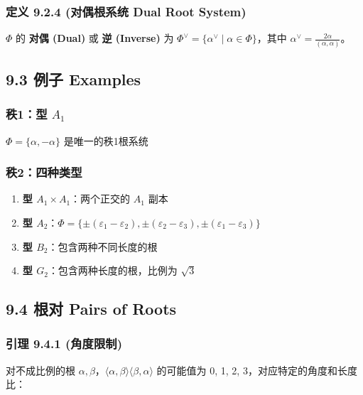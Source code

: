 \subsubsection{定义 9.2.4 (对偶根系统 Dual Root System)}

$\Phi$ 的 \textbf{对偶 (Dual)} 或 \textbf{逆 (Inverse)} 为 $\Phi^\vee = \{\alpha^\vee \mid \alpha \in \Phi\}$，其中 $\alpha^\vee = \frac{2\alpha}{(\alpha, \alpha)}$。

\subsection{9.3 例子 Examples}

\subsubsection{秩1：型 \texorpdfstring{$A_1$}{A_1}}

$\Phi = \{\alpha, -\alpha\}$ 是唯一的秩1根系统

\subsubsection{秩2：四种类型}

\begin{enumerate}
	\item \textbf{型 $A_1 \times A_1$}：两个正交的 $A_1$ 副本
	\item \textbf{型 $A_2$}：$\Phi = \{\pm(\varepsilon_1 - \varepsilon_2), \pm(\varepsilon_2 - \varepsilon_3), \pm(\varepsilon_1 - \varepsilon_3)\}$
	\item \textbf{型 $B_2$}：包含两种不同长度的根
	\item \textbf{型 $G_2$}：包含两种长度的根，比例为 $\sqrt{3}$
\end{enumerate}

\subsection{9.4 根对 Pairs of Roots}

\subsubsection{引理 9.4.1 (角度限制)}

对不成比例的根 $\alpha, \beta$，$\langle\alpha, \beta\rangle\langle\beta, \alpha\rangle$ 的可能值为 0, 1, 2, 3，对应特定的角度和长度比：

